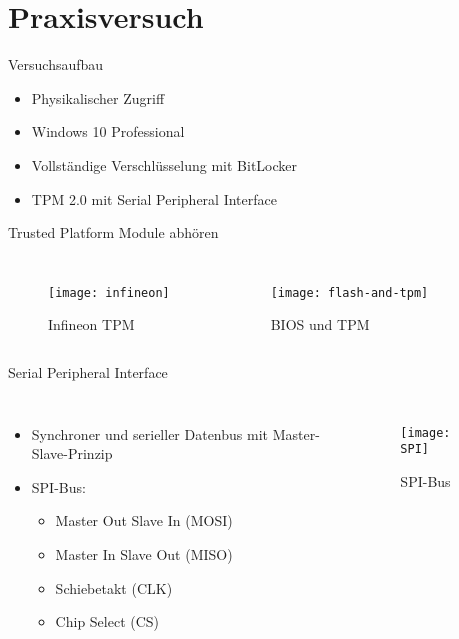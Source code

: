 \documentclass[10pt]{beamer}
\begin{document}
	
	\section{Praxisversuch}
	
	\begin{frame}{Versuchsaufbau}
		\begin{itemize}[<+- | alert@+>]
			\item Physikalischer Zugriff
			\item Windows 10 Professional
			\item Vollständige Verschlüsselung mit BitLocker
			\item TPM 2.0 mit Serial Peripheral Interface
		\end{itemize}
	\end{frame}
	
	\begin{frame}{Trusted Platform Module abhören}
			\begin{columns}[T,onlytextwidth]
			\begin{figure}[h!]
	\centering
	\texttt{[image: infineon]}
	\caption{Infineon TPM \cite{.15122021}}
\end{figure}
			\begin{figure}[h!]
				\centering
				\texttt{[image: flash-and-tpm]}
				\caption{BIOS und TPM \cite{.16122020}}
			\end{figure}
		\end{columns}
	\end{frame}
	
	\begin{frame}{Serial Peripheral Interface}			
		\begin{columns}[T,onlytextwidth]
		\begin{itemize}[<+- | alert@+>]
	\item Synchroner und serieller Datenbus mit Master-Slave-Prinzip
	\item SPI-Bus:
	\begin{itemize}
		\item Master Out Slave In (MOSI)
		\item Master In Slave Out (MISO)
		\item Schiebetakt (CLK)
		\item Chip Select (CS)
	\end{itemize}
\end{itemize}
			\begin{figure}[h!]
				\centering
				\texttt{[image: SPI]}
				\caption{SPI-Bus \cite{GIGABYTETECHNOLOGYCO.LTD.}}
			\end{figure}
		\end{columns}
	\cite[S. 335-349]{Wootton.2016}
	\end{frame}
	
\end{document}
